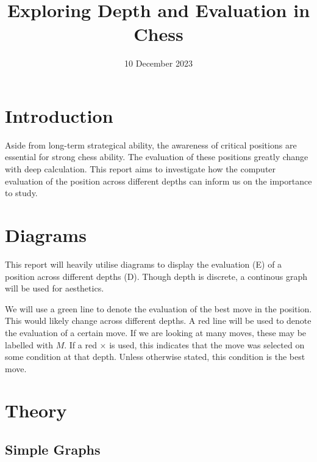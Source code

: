 \documentclass{article}
\title{Exploring Depth and Evaluation in Chess}
\date{10 December 2023}
\begin{document}
\maketitle

\section{Introduction}
Aside from long-term strategical ability, the awareness of critical positions are essential for strong chess ability. The evaluation of these positions greatly change with deep calculation. This report aims to investigate how the computer evaluation of the position across different depths can inform us on the importance to study.

\section{Diagrams}
This report will heavily utilise diagrams to display the evaluation (E) of a position across different depths (D). Though depth is discrete, a continous graph will be used for aesthetics.

\begin{center}
\end{center}

We will use a green line to denote the evaluation of the best move in the position. This would likely change across different depths. A red line will be used to denote the evaluation of a certain move. If we are looking at many moves, these may be labelled with $M$. If a red $\times$ is used, this indicates that the move was selected on some condition at that depth. Unless otherwise stated, this condition is the best move.

\section{Theory}
\subsection{Simple Graphs}
\end{document}
